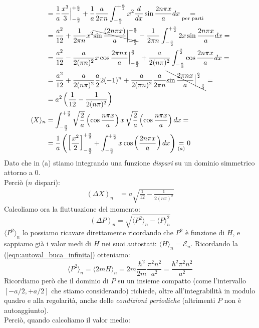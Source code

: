 \documentclass[../../FisicaTeorica.tex]{subfiles}
\begin{document}
\begin{enumerate}
\begin{align*}
&=\frac{1}{a}\frac{x^3}{3}\Big|_{-\frac{a}{2}}^{+\frac{a}{2}}+\frac{1}{a}\frac{a}{2\pi n}\int_{-\frac{a}{2}}^{+\frac{a}{2}} x^2 \frac{d}{dx}\sin\frac{2n\pi x}{a}dx \underset{\text{per parti}}{=}\\
&=\frac{a^2}{12}+\frac{1}{2\pi n} x^2 \bcancel{\sin\frac{(2n\pi x)}{a}\Big|_{-\frac{a}{2}}^{+\frac{a}{2}}} - \frac{1}{2\pi n}\int_{-\frac{a}{2}}^{+\frac{a}{2}} 2x \sin \frac{2n\pi x}{a} dx=\\
&=\frac{a^2}{12} - \frac{a}{2(\pi n)^2} x \cos\frac{2\pi n x}{a}\Big|_{-\frac{a}{2}}^{\frac{a}{2}} + \frac{a}{2(n\pi)^2}\int_{-\frac{a}{2}}^{\frac{a}{2}} \cos \frac{2n\pi x}{a} dx=\\
&=\frac{a^2}{12}+\frac{a}{2(n\pi)^2}\frac{a}{2}2(-1)^n + \frac{a}{2(\pi n)^2}\frac{a}{2\pi n}\bcancel{\sin\frac{2\pi n x}{a}\Big|_{-\frac{a}{2}}^{\frac{a}{2}}} =\\
&=a^2 \left(\frac{1}{12}-\frac{1}{2(n\pi)^2}\right)\\ \langle X\rangle_n &= \int_{-\frac{a}{2}}^{+\frac{a}{2}}\sqrt{\frac{2}{a}}\left( \cos \frac{n\pi x}{a}\right)x\, \sqrt{\frac{2}{a}}\left( \cos \frac{n\pi x}{a}\right)dx =\\
&=\frac{1}{a}\left( \left[\frac{x^2}{2}\right]^{+\frac{a}{2}}_{-\frac{a}{2}} + \int_{-\frac{a}{2}}^{+\frac{a}{2}} x\cos\left(\frac{2n\pi x}{a}\right) dx\right) \underset{(a)}{=} 0
\end{align*}
Dato che in (a) stiamo integrando una funzione \textit{dispari} su un dominio simmetrico attorno a $0$.\\
Perciò ($n$ dispari):
\begin{align*}
(\Delta X)_n &= a\sqrt{\frac{1}{12}-\frac{1}{2(n\pi)^2}}
\end{align*}
Calcoliamo ora la fluttuazione del momento:
\[
(\Delta P)_n = \sqrt{\langle P^2 \rangle_n - \langle P \rangle^2_n}
\]
$\langle P^2\rangle_n$ lo possiamo ricavare direttamente ricordando che $P^2$ è funzione di $H$, e sappiamo già i valor medi di $H$ nei suoi autostati: $\langle H \rangle_n = \mathcal{E}_n$. Ricordando la (\ref{eqn:autoval_buca_infinita}) otteniamo:
\[
\langle P^2\rangle_n = \langle 2mH\rangle_n = 2m \frac{\hbar^2}{2m}\frac{\pi^2 n^2}{a^2}=\frac{\hbar^2 \pi^2 n^2}{a^2}
\]
Ricordiamo però che il dominio di $P$ su un insieme compatto (come l'intervallo $[-a/2,+a/2]$ che stiamo considerando) richiede, oltre all'integrabilità in modulo quadro e alla regolarità, anche delle \textit{condizioni periodiche} (altrimenti $P$ non è autoaggiunto).\\
Perciò, quando calcoliamo il valor medio:

\end{enumerate}
\end{document}
